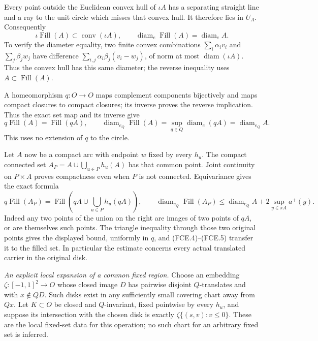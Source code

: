 \documentclass[11pt,a4paper]{article}
\begin{document}
Every point outside the Euclidean convex hull of $\iota A$
has a separating straight line and a ray to the unit circle
which misses that convex hull. It therefore lies in $U_A$.
Consequently
\[
 \iota\operatorname{Fill}(A)\subset
       \operatorname{conv}(\iota A),\qquad
 \operatorname{diam}_e\operatorname{Fill}(A)
       =\operatorname{diam}_e A.
                                                               \tag{FCE.4}
\]
To verify the diameter equality, two finite convex combinations
$\sum_i\alpha_i v_i$ and $\sum_j\beta_j w_j$ have difference
$\sum_{i,j}\alpha_i\beta_j(v_i-w_j)$, of norm at most
$\operatorname{diam}(\iota A)$. Thus the convex hull has this
same diameter; the reverse inequality uses $A\subset
\operatorname{Fill}(A)$.

A homeomorphism $q:O\to O$ maps complement components
bijectively and maps compact closures to compact closures;
its inverse proves the reverse implication. Thus the exact
set map and its inverse give
\[
 q\operatorname{Fill}(A)=\operatorname{Fill}(qA),\qquad
 \operatorname{diam}_{e_Q}\operatorname{Fill}(A)
       =\sup_{q\in Q}\operatorname{diam}_e(qA)
       =\operatorname{diam}_{e_Q}A.
                                                               \tag{FCE.5}
\]
This uses no extension of $q$ to the circle.

Let $A$ now be a compact arc with endpoint $w$ fixed by
every $h_u$. The compact connected set
$A_P=A\cup\bigcup_{u\in P}h_u(A)$ has that common point.
Joint continuity on $P\times A$ proves compactness even
when $P$ is not connected. Equivariance gives the exact formula
\[
 q\operatorname{Fill}(A_P)=
 \operatorname{Fill}\left(qA\cup\bigcup_{u\in P}h_u(qA)\right),
 \qquad
 \operatorname{diam}_{e_Q}\operatorname{Fill}(A_P)
 \leq\operatorname{diam}_{e_Q}A
            +2\sup_{y\in\pi A}a^+(y).
                                                               \tag{FCE.6}
\]
Indeed any two points of the union on the right are images of
two points of $qA$, or are themselves such points. The triangle
inequality through those two original points gives the displayed
bound, uniformly in $q$, and (FCE.4)--(FCE.5) transfer it to
the filled set. In particular the estimate concerns every
actual translated carrier in the original disk.

\emph{An explicit local expansion of a common fixed region.}
Choose an embedding
$\zeta:[-1,1]^2\to O$ whose closed image $D$ has pairwise
disjoint $Q$-translates and with $x\notin QD$.
Such disks exist in any sufficiently small covering chart
away from $Qx$. Let $K\subset O$ be closed and $Q$-invariant,
fixed pointwise by every $h_u$, and suppose its intersection
with the chosen disk is exactly
$\zeta\{(s,v):v\leq0\}$. These are the local fixed-set data
for this operation; no such chart for an arbitrary fixed set
is inferred.
\end{document}
